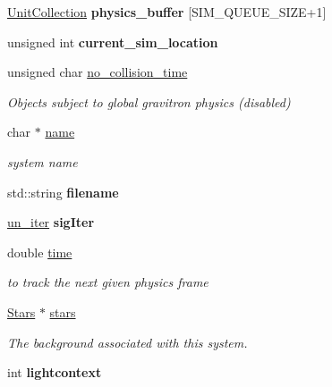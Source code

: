 \begin{DoxyCompactItemize}
\item 
\hyperlink{classUnitCollection}{Unit\+Collection} {\bfseries physics\+\_\+buffer} \mbox{[}S\+I\+M\+\_\+\+Q\+U\+E\+U\+E\+\_\+\+S\+I\+ZE+1\mbox{]}\hypertarget{classStarSystem_a6df109ee57f3799124a0579f6fbbbe90}{}\label{classStarSystem_a6df109ee57f3799124a0579f6fbbbe90}

\item 
unsigned int {\bfseries current\+\_\+sim\+\_\+location}\hypertarget{classStarSystem_a7352b3df7e31373d978ddac8ec7106ef}{}\label{classStarSystem_a7352b3df7e31373d978ddac8ec7106ef}

\item 
unsigned char \hyperlink{classStarSystem_a9516100378d6413d084200ae7b848175}{no\+\_\+collision\+\_\+time}\hypertarget{classStarSystem_a9516100378d6413d084200ae7b848175}{}\label{classStarSystem_a9516100378d6413d084200ae7b848175}

\begin{DoxyCompactList}\small\item\em Objects subject to global gravitron physics (disabled) \end{DoxyCompactList}\item 
char $\ast$ \hyperlink{classStarSystem_a1ca90e6ba69744ed55bb6009fd000c2b}{name}\hypertarget{classStarSystem_a1ca90e6ba69744ed55bb6009fd000c2b}{}\label{classStarSystem_a1ca90e6ba69744ed55bb6009fd000c2b}

\begin{DoxyCompactList}\small\item\em system name \end{DoxyCompactList}\item 
std\+::string {\bfseries filename}\hypertarget{classStarSystem_a609850f033721f2aa8d8b7097cb2299e}{}\label{classStarSystem_a609850f033721f2aa8d8b7097cb2299e}

\item 
\hyperlink{classUnitCollection_1_1UnitIterator}{un\+\_\+iter} {\bfseries sig\+Iter}\hypertarget{classStarSystem_a0515d06590bec2ccbf853fd199595745}{}\label{classStarSystem_a0515d06590bec2ccbf853fd199595745}

\item 
double \hyperlink{classStarSystem_a1dffd2f3fe4cbb0907cb2270158c0a3a}{time}\hypertarget{classStarSystem_a1dffd2f3fe4cbb0907cb2270158c0a3a}{}\label{classStarSystem_a1dffd2f3fe4cbb0907cb2270158c0a3a}

\begin{DoxyCompactList}\small\item\em to track the next given physics frame \end{DoxyCompactList}\item 
\hyperlink{classStars}{Stars} $\ast$ \hyperlink{classStarSystem_aa7f7e879d3c0c788bf1a2ac0fc7c8e03}{stars}
\begin{DoxyCompactList}\small\item\em The background associated with this system. \end{DoxyCompactList}\item 
int {\bfseries lightcontext}\hypertarget{classStarSystem_a7011126018924af657651172f99fd5fe}{}\label{classStarSystem_a7011126018924af657651172f99fd5fe}


\end{DoxyCompactItemize}
